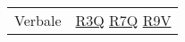 \begin{center}
\begin{longtable}[!h]{m{50px} m{50px}}
        Verbale                           & \hyperref[tab:RequisitiQualita]{R3Q}
        \newline \hyperref[tab:RequisitiQualita]{R7Q}
        \newline \hyperref[tab:RequisitiQualita]{R9V}                                   \\
    \end{longtable}
\end{center}

